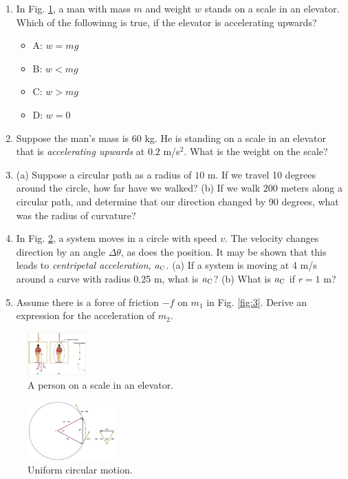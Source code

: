 \documentclass{article}
\begin{document}
\begin{enumerate}
\item In Fig. \ref{fig:1}, a man with mass $m$ and weight $w$ stands on a scale in an elevator.  Which of the followinng is true, if the elevator is accelerating upwards?
\begin{itemize}
\item A: $w = mg$
\item B: $w < mg$
\item C: $w > mg$
\item D: $w = 0$
\end{itemize}
\item Suppose the man's mass is $60$ kg.  He is standing on a scale in an elevator that is \textit{accelerating upwards} at $0.2$ m/s$^{2}$.  What is the weight on the scale? \\ \vspace{1cm}
\item (a) Suppose a circular path as a radius of $10$ m.  If we travel 10 degrees around the circle, how far have we walked? (b) If we walk $200$ meters along a circular path, and determine that our direction changed by 90 degrees, what was the radius of curvature? \\ \vspace{1cm}
\item In Fig. \ref{fig:2}, a system moves in a circle with speed $v$.  The velocity changes direction by an angle $\Delta\theta$, as does the position.  It may be shown that this leads to \textit{centripetal acceleration}, $a_{\rm C}$.  (a) If a system is moving at 4 m/s around a curve with radius 0.25 m, what is $a_{\rm C}$? (b) What is $a_{\rm C}$ if $r = 1$ m? \\
\item Assume there is a force of friction $-f$ on $m_1$ in Fig. \ref{fig:3}.  Derive an expression for the acceleration of $m_2$.
\end{enumerate}

\begin{figure}
\centering
\includegraphics[width=0.2\textwidth,trim=13cm 0cm 0cm 0cm,clip=true]{elevator.png}
\caption{\label{fig:1} A person on a scale in an elevator.}
\end{figure}

\begin{figure}
\centering
\includegraphics[width=0.3\textwidth]{figures/circle.png}
\caption{\label{fig:2} Uniform circular motion.}
\end{figure}
\end{document}
